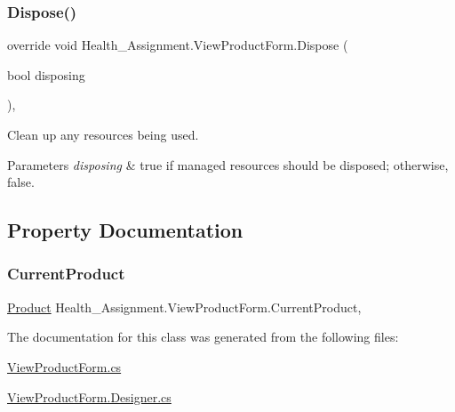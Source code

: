 \subsubsection{\texorpdfstring{Dispose()}{Dispose()}}
{\footnotesize\ttfamily override void Health\+\_\+\+Assignment.\+View\+Product\+Form.\+Dispose (\begin{DoxyParamCaption}\item[{bool}]{disposing }\end{DoxyParamCaption})\hspace{0.3cm}{\ttfamily [inline]}, {\ttfamily [protected]}}



Clean up any resources being used. 


\begin{DoxyParams}{Parameters}
{\em disposing} & true if managed resources should be disposed; otherwise, false.\\
\hline
\end{DoxyParams}


\subsection{Property Documentation}
\mbox{\label{class_health___assignment_1_1_view_product_form_ae3c9a63cd83ddf0398e752ee2f5f08e3}} 
\subsubsection{\texorpdfstring{Current\+Product}{CurrentProduct}}
{\footnotesize\ttfamily \hyperlink{class_health___assignment_1_1_product}{Product} Health\+\_\+\+Assignment.\+View\+Product\+Form.\+Current\+Product\hspace{0.3cm}{\ttfamily [get]}, {\ttfamily [set]}}



The documentation for this class was generated from the following files\+:\begin{DoxyCompactItemize}
\item 
\hyperlink{_view_product_form_8cs}{View\+Product\+Form.\+cs}\item 
\hyperlink{_view_product_form_8_designer_8cs}{View\+Product\+Form.\+Designer.\+cs}\end{DoxyCompactItemize}
